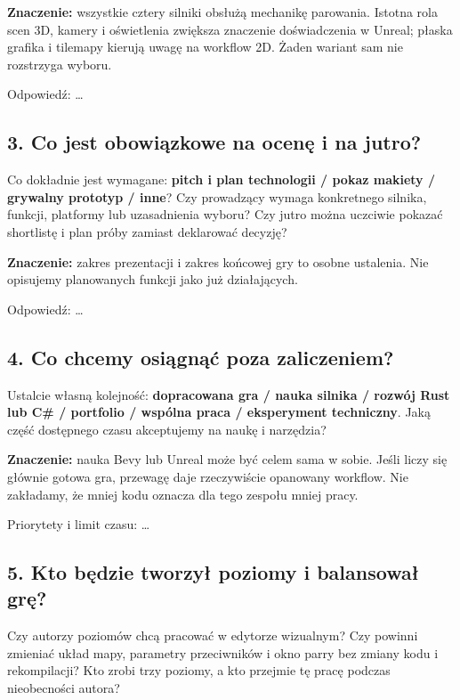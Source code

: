 \documentclass[10pt,a4paper]{article}
\begin{document}
\textbf{Znaczenie:} wszystkie cztery silniki obsłużą mechanikę parowania. Istotna rola scen 3D, kamery i oświetlenia zwiększa znaczenie doświadczenia w Unreal; płaska grafika i tilemapy kierują uwagę na workflow 2D. Żaden wariant sam nie rozstrzyga wyboru.



Odpowiedź: …



\subsection*{3. Co jest obowiązkowe na ocenę i na jutro?}


Co dokładnie jest wymagane: \textbf{pitch i plan technologii / pokaz makiety / grywalny prototyp / inne}? Czy prowadzący wymaga konkretnego silnika, funkcji, platformy lub uzasadnienia wyboru? Czy jutro można uczciwie pokazać shortlistę i plan próby zamiast deklarować decyzję?



\textbf{Znaczenie:} zakres prezentacji i zakres końcowej gry to osobne ustalenia. Nie opisujemy planowanych funkcji jako już działających.



Odpowiedź: …



\subsection*{4. Co chcemy osiągnąć poza zaliczeniem?}


Ustalcie własną kolejność: \textbf{dopracowana gra / nauka silnika / rozwój Rust lub C\# / portfolio / wspólna praca / eksperyment techniczny}. Jaką część dostępnego czasu akceptujemy na naukę i narzędzia?



\textbf{Znaczenie:} nauka Bevy lub Unreal może być celem sama w sobie. Jeśli liczy się głównie gotowa gra, przewagę daje rzeczywiście opanowany workflow. Nie zakładamy, że mniej kodu oznacza dla tego zespołu mniej pracy.



Priorytety i limit czasu: …



\subsection*{5. Kto będzie tworzył poziomy i balansował grę?}


Czy autorzy poziomów chcą pracować w edytorze wizualnym? Czy powinni zmieniać układ mapy, parametry przeciwników i okno parry bez zmiany kodu i rekompilacji? Kto zrobi trzy poziomy, a kto przejmie tę pracę podczas nieobecności autora?
\end{document}

